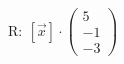 \documentclass[preview]{standalone}
\begin{document}
\begin{center}
$\mathrm{R: \:} [\vec{x}] \cdot \begin{pmatrix} 5 \\ -1 \\ -3 \end{pmatrix}$
\end{center}
\end{document}
